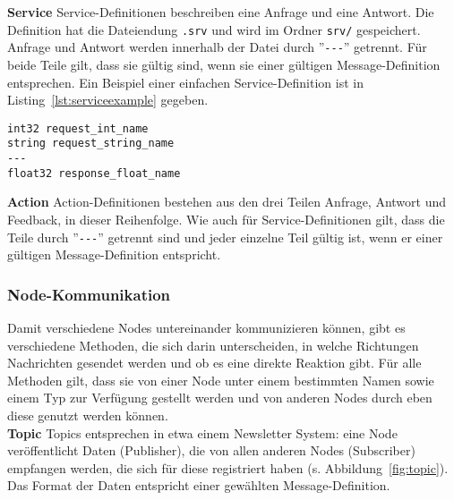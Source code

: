 \textbf{Service} Service-Definitionen beschreiben eine Anfrage und eine Antwort.
Die Definition hat die Dateiendung \verb|.srv| und wird im Ordner \verb|srv/| gespeichert.
Anfrage und Antwort werden innerhalb der Datei durch ''\verb|---|'' getrennt.
Für beide Teile gilt, dass sie gültig sind, wenn sie einer gültigen Message-Definition entsprechen.
Ein Beispiel einer einfachen Service-Definition ist in Listing~\ref{lst:serviceexample} gegeben.\\
\begin{minipage}{\linewidth}%
\begin{lstlisting}[caption={Beispiel einer Service-Definition}, label={lst:serviceexample}]
int32 request_int_name
string request_string_name
---
float32 response_float_name
\end{lstlisting}
\end{minipage}

\textbf{Action} Action-Definitionen bestehen aus den drei Teilen Anfrage, Antwort und Feedback, in dieser Reihenfolge.
Wie auch für Service-Definitionen gilt, dass die Teile durch ''\verb|---|'' getrennt sind und jeder einzelne Teil gültig ist, wenn er einer gültigen Message-Definition entspricht.

\subsubsection{Node-Kommunikation}{\label{rosnodecomm}}
Damit verschiedene Nodes untereinander kommunizieren können, gibt es verschiedene Methoden, die sich darin unterscheiden, in welche Richtungen Nachrichten gesendet werden und ob es eine direkte Reaktion gibt.
Für alle Methoden gilt, dass sie von einer Node unter einem bestimmten Namen sowie einem Typ zur Verfügung gestellt werden und von anderen Nodes durch eben diese genutzt werden können.\\

\textbf{Topic} Topics entsprechen in etwa einem Newsletter System: eine Node veröffentlicht Daten (Publisher), die von allen anderen Nodes (Subscriber) empfangen werden, die sich für diese registriert haben (s. Abbildung~\ref{fig:topic}).
Das Format der Daten entspricht einer gewählten Message-Definition.\\

